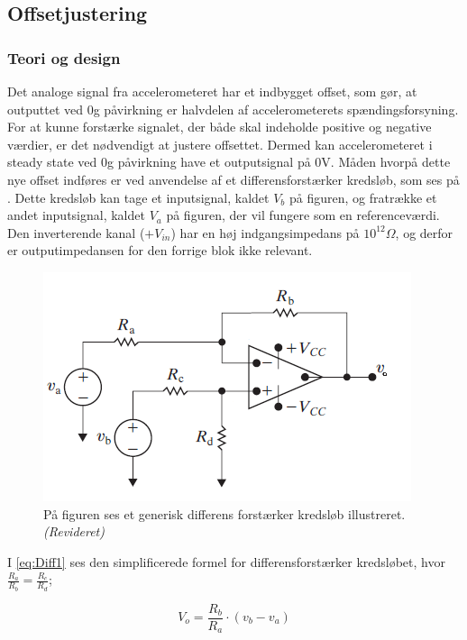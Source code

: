 \subsection{Offsetjustering}
\subsubsection{Teori og design} \label{Offset_Teori_Design}
Det analoge signal fra accelerometeret har et indbygget offset, som gør, at outputtet ved $0$g påvirkning er halvdelen af accelerometerets spændingsforsyning. For at kunne forstærke signalet, der både skal indeholde positive og negative værdier, er det nødvendigt at justere offsettet. Dermed kan accelerometeret i steady state ved $0$g påvirkning have et outputsignal på $0$V. Måden hvorpå dette nye offset indføres er ved anvendelse af et differensforstærker kredsløb, som ses på . Dette kredsløb kan tage et inputsignal, kaldet $V_{b}$ på figuren, og fratrække et andet inputsignal, kaldet $V_{a}$ på figuren, der vil fungere som en referenceværdi. Den inverterende kanal ($+V_{in}$) har en høj indgangsimpedans på $10^{12}\Omega$, og derfor er outputimpedansen for den forrige blok ikke relevant. \cite{Corporation1995} 

\begin{figure}[H]
\centering
\includegraphics[scale=1.3]{figures/cProblemloesning/Differensforstaerker_generisk.png}
\caption{På figuren ses et generisk differens forstærker kredsløb illustreret.\textit{(Revideret)} \cite{Nilsson2011}}
\label{fig:Differensforstaerker_generisk}
\end{figure}

\noindent I \eqref{eq:Diff1} ses den simplificerede formel for differensforstærker kredsløbet, hvor $\frac{R_a}{R_b} = \frac{R_c}{R_d}$;

\begin{equation}\label{eq:Diff1}
V_o = \frac{R_b}{R_a} \cdot (v_b - v_a)
\end{equation}

